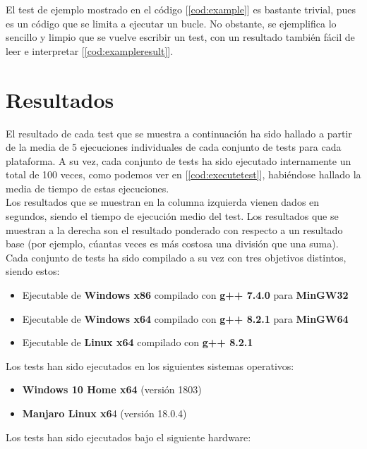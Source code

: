 El test de ejemplo mostrado en el código [\ref{cod:example}] es bastante trivial, pues es un código que se limita a ejecutar un bucle. No obstante, se ejemplifica lo sencillo y limpio que se vuelve escribir un test, con un resultado también fácil de leer e interpretar [\ref{cod:exampleresult}].

\section{Resultados}

El resultado de cada test que se muestra a continuación ha sido hallado a partir de la media de 5 ejecuciones individuales de cada conjunto de tests para cada plataforma. A su vez, cada conjunto de tests ha sido ejecutado internamente un total de 100 veces, como podemos ver en [\ref{cod:executetest}], habiéndose hallado la media de tiempo de estas ejecuciones.\\

Los resultados que se muestran en la columna izquierda vienen dados en segundos, siendo el tiempo de ejecución medio del test. Los resultados que se muestran a la derecha son el resultado ponderado con respecto a un resultado base (por ejemplo, cúantas veces es más costosa una división que una suma).\\

Cada conjunto de tests ha sido compilado a su vez con tres objetivos distintos, siendo estos:

\begin{itemize}
	\item Ejecutable de \textbf{Windows x86} compilado con \textbf{g++ 7.4.0} para \textbf{MinGW32}
	\item Ejecutable de \textbf{Windows x64} compilado con \textbf{g++ 8.2.1} para \textbf{MinGW64}
	\item Ejecutable de \textbf{Linux x64} compilado con \textbf{g++ 8.2.1}
\end{itemize}

Los tests han sido ejecutados en los siguientes sistemas operativos:

\begin{itemize}
	\item \textbf{Windows 10 Home x64} (versión 1803)
	\item \textbf{Manjaro Linux x6}4 (versión 18.0.4)
\end{itemize}

Los tests han sido ejecutados bajo el siguiente hardware:

